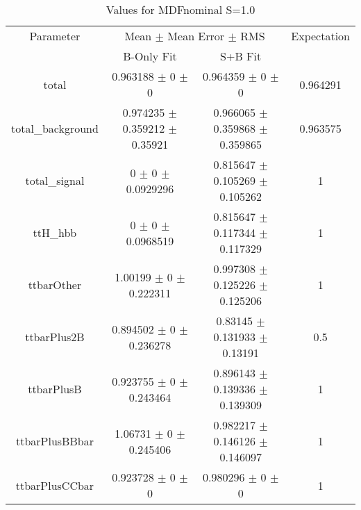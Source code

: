 \begin{table}
\centering
\caption{Values for MDFnominal S=1.0}
\begin{tabular}{cccc}
\toprule
Parameter & \multicolumn{2}{c}{Mean $\pm$ Mean Error $\pm$ RMS} & Expectation\\
 & B-Only Fit & S+B Fit & \\
\midrule
total & \num{0.963188} $\pm$ \num{0} $\pm$ \num{0} & \num{0.964359} $\pm$ \num{0} $\pm$ \num{0} & \num{0.964291}\\
total\_background & \num{0.974235} $\pm$ \num{0.359212} $\pm$ \num{0.35921} & \num{0.966065} $\pm$ \num{0.359868} $\pm$ \num{0.359865} & \num{0.963575}\\
total\_signal & \num{0} $\pm$ \num{0} $\pm$ \num{0.0929296} & \num{0.815647} $\pm$ \num{0.105269} $\pm$ \num{0.105262} & \num{1}\\
ttH\_hbb & \num{0} $\pm$ \num{0} $\pm$ \num{0.0968519} & \num{0.815647} $\pm$ \num{0.117344} $\pm$ \num{0.117329} & \num{1}\\
ttbarOther & \num{1.00199} $\pm$ \num{0} $\pm$ \num{0.222311} & \num{0.997308} $\pm$ \num{0.125226} $\pm$ \num{0.125206} & \num{1}\\
ttbarPlus2B & \num{0.894502} $\pm$ \num{0} $\pm$ \num{0.236278} & \num{0.83145} $\pm$ \num{0.131933} $\pm$ \num{0.13191} & \num{0.5}\\
ttbarPlusB & \num{0.923755} $\pm$ \num{0} $\pm$ \num{0.243464} & \num{0.896143} $\pm$ \num{0.139336} $\pm$ \num{0.139309} & \num{1}\\
ttbarPlusBBbar & \num{1.06731} $\pm$ \num{0} $\pm$ \num{0.245406} & \num{0.982217} $\pm$ \num{0.146126} $\pm$ \num{0.146097} & \num{1}\\
ttbarPlusCCbar & \num{0.923728} $\pm$ \num{0} $\pm$ \num{0} & \num{0.980296} $\pm$ \num{0} $\pm$ \num{0} & \num{1}\\
\bottomrule
\end{tabular}
\end{table}